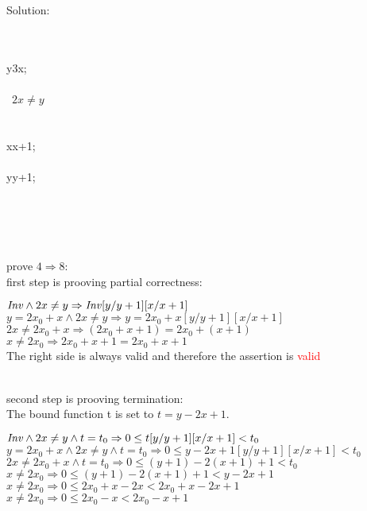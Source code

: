 \documentclass[a4paper]{scrartcl}
\begin{document}
Solution:\\
\begin{center}
  \begin{ALG}
    \\
    \\
    \ASS y{3x};\\
    \\
    \WHILE\ $2x\neq y$\ \DO\\
    \>\\
    \>\\
    \>\ASS x{x+1};\\
    \>\\
    \>\ASS y{y+1};\\
    \>\\
    \OD\\
    \\
    \\
  \end{ALG}
\end{center}
prove $4 \Rightarrow 8$:\\
first step is prooving partial correctness:\\
\begin{center}
$\mathit{Inv} \land 2x \neq y \Rightarrow \mathit{Inv} [y/y+1][x/x+1]$\\
$y = 2x_0 + x \land 2x \neq y \Rightarrow y = 2x_0 + x [y/y+1][x/x+1]$\\
$2x \neq 2x_0 + x \Rightarrow (2x_0 + x + 1) = 2x_0 + (x+1)$\\
$x \neq 2x_0 \Rightarrow 2x_0 + x + 1 = 2x_0 + x+1$\\
The right side is always valid and therefore the assertion is \textcolor{red}{valid}
\end{center} 
\\
second step is prooving termination:\\
The bound function t is set to $t = y - 2x + 1$.\\
\begin{center}
$\mathit{Inv} \land 2x \neq y \land t = t_0 \Rightarrow 0 \leq t[y/y+1][x/x+1] < t_0$\\
$y = 2x_0 + x \land 2x \neq y \land t = t_0 \Rightarrow 0 \leq y - 2x + 1[y/y+1][x/x+1] < t_0$\\
$2x \neq 2x_0 + x \land t = t_0 \Rightarrow 0 \leq (y + 1) - 2(x + 1) + 1 < t_0$\\
$x \neq 2x_0 \Rightarrow 0 \leq (y + 1) - 2(x + 1) + 1 < y - 2x + 1$\\
$x \neq 2x_0 \Rightarrow 0 \leq 2x_0 + x - 2x < 2x_0 + x - 2x + 1$\\
$x \neq 2x_0 \Rightarrow 0 \leq 2x_0 - x < 2x_0 - x + 1$\\
\end{center} 
\end{document}

